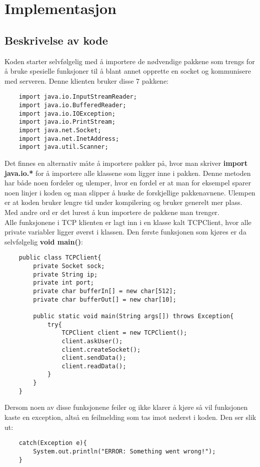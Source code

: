 \section{Implementasjon}
\subsection{Beskrivelse av kode}
Koden starter selvfølgelig med å importere de nødvendige pakkene som trengs for å bruke spesielle funksjoner til å blant annet opprette en socket og kommunisere med serveren. Denne klienten bruker disse 7 pakkene:
\begin{lstlisting}
	import java.io.InputStreamReader;
	import java.io.BufferedReader;
	import java.io.IOException;
	import java.io.PrintStream;
	import java.net.Socket;
	import java.net.InetAddress;
	import java.util.Scanner;
\end{lstlisting}

Det finnes en alternativ måte å importere pakker på, hvor man skriver \textbf{import java.io.*} for å importere alle klassene som ligger inne i pakken. Denne metoden har både noen fordeler og ulemper, hvor en fordel er at man for eksempel sparer noen linjer i koden og man slipper å huske de forskjellige pakkenavnene. Ulempen er at koden bruker lengre tid under kompilering og bruker generelt mer plass. Med andre ord er det lurest å kun importere de pakkene man trenger.\\

Alle funksjonene i TCP klienten er lagt inn i en klasse kalt TCPClient, hvor alle private variabler ligger øverst i klassen. Den første funksjonen som kjøres er da selvfølgelig \textbf{void main()}:
\begin{lstlisting}
	public class TCPClient{
		private Socket sock;
		private String ip;
		private int port;
		private char bufferIn[] = new char[512];
		private char bufferOut[] = new char[10];
		
		public static void main(String args[]) throws Exception{
			try{
				TCPClient client = new TCPClient();
				client.askUser();
				client.createSocket();
				client.sendData();
				client.readData();
			}
		}
	}
\end{lstlisting}

Dersom noen av disse funksjonene feiler og ikke klarer å kjøre så vil funksjonen kaste en exception, altså en feilmelding som tas imot nederst i koden. Den ser slik ut:
\begin{lstlisting}
	catch(Exception e){
		System.out.println("ERROR: Something went wrong!");
	}
\end{lstlisting}

